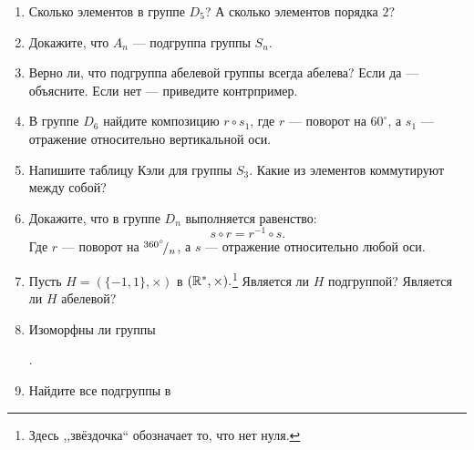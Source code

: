 \begin{enumerate}
    \item Сколько элементов в группе $D_5$? А сколько элементов порядка $2$?
    \item Докажите, что $A_n$ --- подгруппа группы $S_n$.
    \item Верно ли, что подгруппа абелевой группы всегда абелева? Если да — объясните. Если нет — приведите контрпример.
    \item В группе $D_6$ найдите композицию $r \circ s_1$, где $r$ --- поворот на $60^\circ$, а $s_1$ --- отражение относительно вертикальной оси.
    \item Напишите таблицу Кэли для группы $S_3$. Какие из элементов коммутируют между собой?
    \item Докажите, что в группе $D_n$ выполняется равенство: \[
            s \circ r = r^{-1} \circ s.
        \]
        Где $r$ --- поворот на ${}^{360^\circ}\!/_{n}$, а $s$ --- отражение относительно любой оси.
    \item Пусть $H = (\{-1, 1\}, \times)$ в $(\mathbb R^*, \times).$\footnote{Здесь ,,звёздочка`` обозначает то, что нет нуля.} Является ли $H$ подгруппой? Является ли $H$ абелевой?
    \item Изоморфны ли группы
        .
    \item Найдите все подгруппы в 
\end{enumerate}
